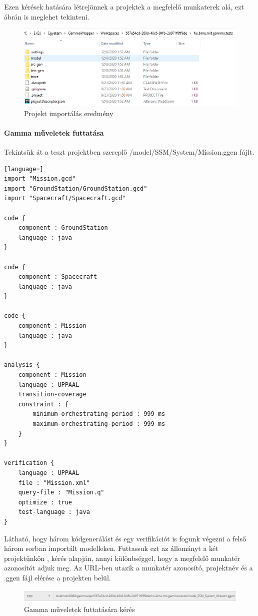 Ezen kérések hatására létrejönnek a projektek a megfelelő munkaterek alá, ezt  ábrán is meglehet tekinteni.

\begin{figure}[!ht]
	\includegraphics[width=150mm, keepaspectratio]{figures/add_project_result.PNG}
	\caption{Projekt importálás eredmény}
	\label{fig:add_project_result}
\end{figure}

\paragraph{Gamma műveletek futtatása} Tekintsük át a teszt projektben szereplő /model/SSM/System/Mission.ggen fájlt.

\begin{lstlisting}[language=]
import "Mission.gcd"
import "GroundStation/GroundStation.gcd"
import "Spacecraft/Spacecraft.gcd"

code {
	component : GroundStation
	language : java
}

code {
	component : Spacecraft
	language : java
}

code {
	component : Mission
	language : java
}

analysis {
	component : Mission
	language : UPPAAL
	transition-coverage
	constraint : {
		minimum-orchestrating-period : 999 ms
		maximum-orchestrating-period : 999 ms
	}
}

verification {
	language : UPPAAL
	file : "Mission.xml"
	query-file : "Mission.q"
	optimize : true
	test-language : java
}
\end{lstlisting}
Látható, hogy három kódgenerálást és egy verifikációt is fogunk végezni a felső három sorban importált modelleken. Futtassuk ezt az állományt a két projektünkön ,  kérés alapján, annyi különbséggel, hogy a megfelelő munkatér azonosítót adjuk meg. Az URL-ben utazik a munkatér azonosító, projektnév és a .ggen fájl elérése a projekten belül.
\begin{figure}[!ht]
	\includegraphics[width=150mm, keepaspectratio]{figures/request_gamma_operation.PNG}
	\caption{Gamma műveletek futtatására kérés}
	\label{fig:request_gamma_operation}
\end{figure}

